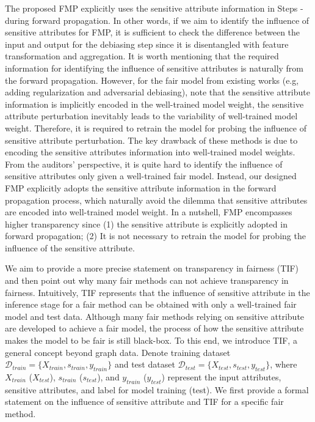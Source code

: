 \documentclass[letterpaper]{article} %
\theoremstyle{plain}
\theoremstyle{definition}
\theoremstyle{remark}
\begin{document}
The proposed FMP explicitly uses the sensitive attribute information in Steps \textbf{}-\textbf{} during forward propagation. In other words, if we aim to identify the influence of sensitive attributes for FMP, it is sufficient to check the difference between the input and output for the debiasing step since it is disentangled with feature transformation and aggregation. It is worth mentioning that the required information for identifying the influence of sensitive attributes is naturally from the forward propagation. However, for the fair model from existing works (e.g, adding regularization and adversarial debiasing), note that the sensitive attribute information is implicitly encoded in the well-trained model weight, the sensitive attribute perturbation inevitably leads to the variability of well-trained model weight. Therefore, it is required to retrain the model for probing the influence of sensitive attribute perturbation. The key drawback of these methods is due to encoding the sensitive attributes information into well-trained model weights. From the auditors' perspective, it is quite hard to identify the influence of sensitive attributes only given a well-trained fair model. Instead, our designed FMP explicitly adopts the sensitive attribute information in the forward propagation process, which naturally avoid the dilemma that sensitive attributes are encoded into well-trained model weight. In a nutshell, FMP encompasses higher transparency since (1) the sensitive attribute is explicitly adopted in forward propagation; (2) It is not necessary to retrain the model for probing the influence of the sensitive attribute.

We aim to provide a more precise statement on transparency in fairness (TIF) and then point out why many fair methods can not achieve transparency in fairness. Intuitively, TIF represents that the influence of sensitive attribute in the inference stage for a fair method can be obtained with only a well-trained fair model and test data. Although many fair methods relying on sensitive attribute are developed to achieve a fair model, the process of how the sensitive attribute makes the model to be fair is still black-box. To this end, we introduce TIF, a general concept beyond graph data. Denote training dataset $\mathcal{D}_{train}=\{X_{train}, s_{train}, y_{train}\}$ and test dataset $\mathcal{D}_{test}=\{X_{test}, s_{test}, y_{test}\}$, where $X_{train}$ ($X_{test}$), $s_{train}$ ($s_{test}$), and $y_{train}$ ($y_{test}$) represent the input attributes, sensitive attributes, and label for model training (test).  We first provide a formal statement on the influence of sensitive attribute and TIF for a specific fair method.
\end{document}
